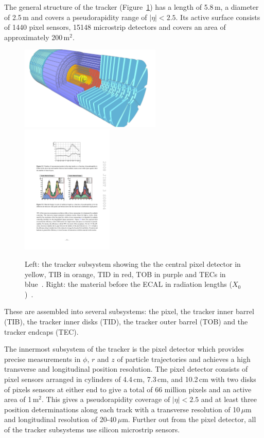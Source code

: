 The general structure of the tracker (Figure~\ref{fig:apparatus:tracker}) has a length of 5.8\,m, a diameter of 2.5\,m and covers a pseudorapidity range of $|\eta|<2.5$. Its active surface consists of 1440 pixel sensors, 15148 microstrip detectors and covers an area of approximately 200\,m$^{2}$. 
\begin{figure}[h!]
    \begin{center}
        \includegraphics[width=0.6\textwidth]{figures/apparatus/tracker_colour.pdf}
        \includegraphics[width=0.39\textwidth]{figures/apparatus/tracker_material.pdf}
    \end{center}
    \caption{Left: the tracker subsystem showing the the central pixel detector in yellow, TIB in orange, TID in red, TOB in purple and TECs in blue~\cite{SketchupCMS}. Right: the material before the ECAL in radiation lengths ($X_{0}$)~\cite{CMSatLHC}.}
    \label{fig:apparatus:tracker}
\end{figure}
These are assembled into several subsystems: the pixel, the tracker inner barrel (TIB), the tracker inner disks (TID), the tracker outer barrel (TOB) and the tracker endcaps (TEC).

The innermost subsystem of the tracker is the pixel detector which provides precise measurements in $\phi$, $r$ and $z$ of particle trajectories and achieves a high transverse and longitudinal position resolution. The pixel detector consists of pixel sensors arranged in cylinders of 4.4\,cm, 7.3\,cm, and 10.2\,cm with two disks of pixels sensors at either end to give a total of 66 million pixels and an active area of 1\,m$^{2}$. This gives a pseudorapidity coverage of $|\eta|<2.5$ and at least three position determinations along each track with a transverse resolution of 10\,$\mu$m and longitudinal resolution of 20-40\,$\mu$m. Further out from the pixel detector, all of the tracker subsystems use silicon microstrip sensors. 


